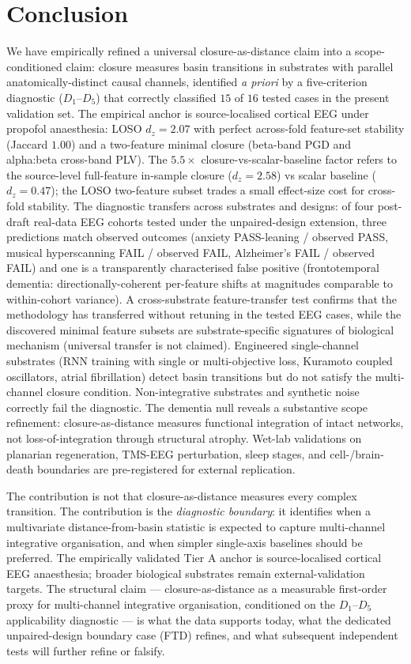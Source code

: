 \documentclass[11pt,a4paper]{article}
\begin{document}
\section{Conclusion}\label{sec:conclusion}

We have empirically refined a universal closure-as-distance claim into a scope-conditioned claim: closure measures basin transitions in substrates with parallel anatomically-distinct causal channels, identified \emph{a priori} by a five-criterion diagnostic ($D_1$--$D_5$) that correctly classified $15$ of $16$ tested cases in the present validation set. The empirical anchor is source-localised cortical EEG under propofol anaesthesia: LOSO $d_z = 2.07$ with perfect across-fold feature-set stability (Jaccard $1.00$) and a two-feature minimal closure (beta-band PGD and alpha:beta cross-band PLV). The $5.5\times$ closure-vs-scalar-baseline factor refers to the source-level full-feature in-sample closure ($d_z = 2.58$) vs scalar baseline ($d_z = 0.47$); the LOSO two-feature subset trades a small effect-size cost for cross-fold stability. The diagnostic transfers across substrates and designs: of four post-draft real-data EEG cohorts tested under the unpaired-design extension, three predictions match observed outcomes (anxiety PASS-leaning / observed PASS, musical hyperscanning FAIL / observed FAIL, Alzheimer's FAIL / observed FAIL) and one is a transparently characterised false positive (frontotemporal dementia: directionally-coherent per-feature shifts at magnitudes comparable to within-cohort variance). A cross-substrate feature-transfer test confirms that the methodology has transferred without retuning in the tested EEG cases, while the discovered minimal feature subsets are substrate-specific signatures of biological mechanism (universal transfer is not claimed). Engineered single-channel substrates (RNN training with single or multi-objective loss, Kuramoto coupled oscillators, atrial fibrillation) detect basin transitions but do not satisfy the multi-channel closure condition. Non-integrative substrates and synthetic noise correctly fail the diagnostic. The dementia null reveals a substantive scope refinement: closure-as-distance measures functional integration of intact networks, not loss-of-integration through structural atrophy. Wet-lab validations on planarian regeneration, TMS-EEG perturbation, sleep stages, and cell-/brain-death boundaries are pre-registered for external replication.

The contribution is not that closure-as-distance measures every complex transition. The contribution is the \emph{diagnostic boundary}: it identifies when a multivariate distance-from-basin statistic is expected to capture multi-channel integrative organisation, and when simpler single-axis baselines should be preferred. The empirically validated Tier A anchor is source-localised cortical EEG anaesthesia; broader biological substrates remain external-validation targets. The structural claim --- closure-as-distance as a measurable first-order proxy for multi-channel integrative organisation, conditioned on the $D_1$--$D_5$ applicability diagnostic --- is what the data supports today, what the dedicated unpaired-design boundary case (FTD) refines, and what subsequent independent tests will further refine or falsify.



\end{document}
